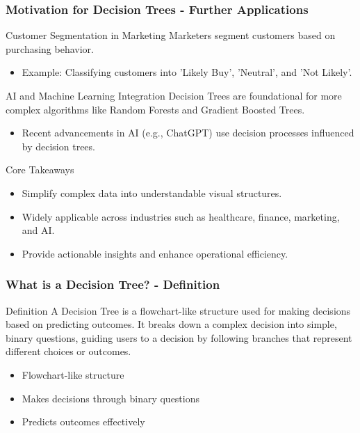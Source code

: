 \documentclass[aspectratio=169]{beamer}
\begin{document}
\begin{frame}[fragile]
    \frametitle{Motivation for Decision Trees - Further Applications}
    \begin{block}{Customer Segmentation in Marketing}
        Marketers segment customers based on purchasing behavior.
        \begin{itemize}
            \item Example: Classifying customers into 'Likely Buy', 'Neutral', and 'Not Likely'.
        \end{itemize}
    \end{block}
    
    \begin{block}{AI and Machine Learning Integration}
        Decision Trees are foundational for more complex algorithms like Random Forests and Gradient Boosted Trees.
        \begin{itemize}
            \item Recent advancements in AI (e.g., ChatGPT) use decision processes influenced by decision trees.
        \end{itemize}
    \end{block}

    \begin{block}{Core Takeaways}
        \begin{itemize}
            \item Simplify complex data into understandable visual structures.
            \item Widely applicable across industries such as healthcare, finance, marketing, and AI.
            \item Provide actionable insights and enhance operational efficiency.
        \end{itemize}
    \end{block}
\end{frame}

\begin{frame}[fragile]
    \frametitle{What is a Decision Tree? - Definition}
    \begin{block}{Definition}
        A Decision Tree is a flowchart-like structure used for making decisions based on predicting outcomes. It breaks down a complex decision into simple, binary questions, guiding users to a decision by following branches that represent different choices or outcomes.
    \end{block}
    
    \begin{itemize}
        \item Flowchart-like structure
        \item Makes decisions through binary questions
        \item Predicts outcomes effectively
    \end{itemize}
\end{frame}
\end{document}
